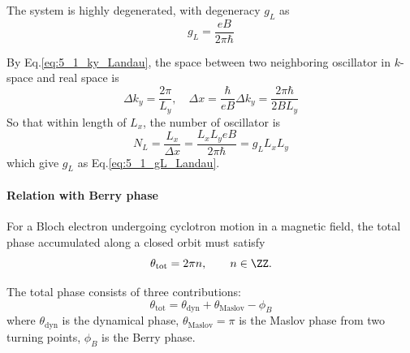 \documentclass[12pt,a4paper]{article}
\begin{document}
    \begin{cor}
        The system is highly degenerated, with degeneracy $g_L$ as
        \begin{equation}
        \label{eq:5_1_gL_Landau}
            g_L =  \frac{eB}{2\pi\hbar}
        \end{equation}
    \end{cor}
    \begin{prf}
        By Eq.\eqref{eq:5_1_ky_Landau}, the space between two neighboring oscillator in $k$-space and real space is
        \[\Delta k_y = \frac{2\pi}{L_y}, \quad
        \Delta x = \frac{\hbar}{eB} \Delta k_y = \frac{2\pi\hbar}{2BL_y} \]
        So that within length of $L_x$, the number of oscillator is
        \[ N_L = \frac{L_x}{\Delta x} = \frac{L_xL_yeB}{2\pi\hbar} = g_L L_x L_y \]
        which give $g_L$ as Eq.\eqref{eq:5_1_gL_Landau}.
    \end{prf}


\paragraph{Relation with Berry phase}

    For a Bloch electron undergoing cyclotron motion in a magnetic field,
    the total phase accumulated along a closed orbit must satisfy
    \begin{equation}
        \theta_{\mathrm{tot}} = 2\pi n , \qquad n \in \ZZ.
    \end{equation}

    The total phase consists of three contributions:
    \begin{equation}
    \label{eq:phase_condition}
        \theta_{\mathrm{tot}} = \theta_{\mathrm{dyn}} + \theta_{\mathrm{Maslov}} - \phi_B
    \end{equation}
    where $\theta_{\mathrm{dyn}}$ is the dynamical phase, $\theta_{\mathrm{Maslov}} = \pi$ is the Maslov phase from two turning points, $\phi_B$ is the Berry phase.
\end{document}

